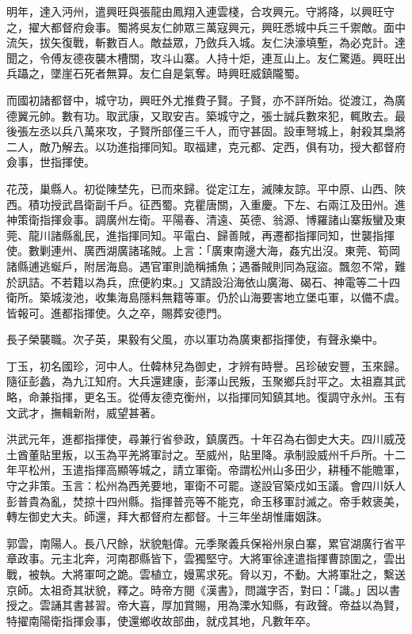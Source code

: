 \begin{pinyinscope}
明年，達入沔州，遣興旺與張龍由鳳翔入連雲棧，合攻興元。守將降，以興旺守之，擢大都督府僉事。蜀將吳友仁帥眾三萬寇興元，興旺悉城中兵三千禦敵。面中流矢，拔矢復戰，斬數百人。敵益眾，乃斂兵入城。友仁決濠填塹，為必克計。達聞之，令傅友德夜襲木槽關，攻斗山寨。人持十炬，連亙山上。友仁驚遁。興旺出兵躡之，墜崖石死者無算。友仁自是氣奪。時興旺威鎮隴蜀。

而國初諸都督中，城守功，興旺外尤推費子賢。子賢，亦不詳所始。從渡江，為廣德翼元帥。數有功。取武康，又取安吉。築城守之，張士誠兵數來犯，輒敗去。最後張左丞以兵八萬來攻，子賢所部僅三千人，而守甚固。設車弩城上，射殺其梟將二人，敵乃解去。以功進指揮同知。取福建，克元都、定西，俱有功，授大都督府僉事，世指揮使。

花茂，巢縣人。初從陳埜先，已而來歸。從定江左，滅陳友諒。平中原、山西、陜西。積功授武昌衛副千戶。征西蜀。克瞿唐關，入重慶。下左、右兩江及田州。進神策衛指揮僉事。調廣州左衛。平陽春、清遠、英德、翁源、博羅諸山寨叛蠻及東莞、龍川諸縣亂民，進指揮同知。平電白、歸善賊，再遷都指揮同知，世襲指揮使。數剿連州、廣西湖廣諸瑤賊。上言：「廣東南邊大海，姦宄出沒。東莞、筍岡諸縣逋逃蜒戶，附居海島。遇官軍則詭稱捕魚；遇番賊則同為寇盜。飄忽不常，難於訊詰。不若籍以為兵，庶便約束。」又請設沿海依山廣海、碣石、神電等二十四衛所。築城浚池，收集海島隱料無籍等軍。仍於山海要害地立堡屯軍，以備不虞。皆報可。進都指揮使。久之卒，賜葬安德門。

長子榮襲職。次子英，果毅有父風，亦以軍功為廣東都指揮使，有聲永樂中。

丁玉，初名國珍，河中人。仕韓林兒為御史，才辨有時譽。呂珍破安豐，玉來歸。隨征彭蠡，為九江知府。大兵還建康，彭澤山民叛，玉聚鄉兵討平之。太祖嘉其武略，命兼指揮，更名玉。從傅友德克衡州，以指揮同知鎮其地。復調守永州。玉有文武才，撫輯新附，威望甚著。

洪武元年，進都指揮使，尋兼行省參政，鎮廣西。十年召為右御史大夫。四川威茂土酋董貼里叛，以玉為平羌將軍討之。至威州，貼里降。承制設威州千戶所。十二年平松州，玉遣指揮高顯等城之，請立軍衛。帝謂松州山多田少，耕種不能贍軍，守之非策。玉言：松州為西羌要地，軍衛不可罷。遂設官築戍如玉議。會四川妖人彭普貴為亂，焚掠十四州縣。指揮普亮等不能克，命玉移軍討滅之。帝手敕褒美，轉左御史大夫。師還，拜大都督府左都督。十三年坐胡惟庸姻誅。

郭雲，南陽人。長八尺餘，狀貌魁偉。元季聚義兵保裕州泉白寨，累官湖廣行省平章政事。元主北奔，河南郡縣皆下，雲獨堅守。大將軍徐達遣指揮曹諒圍之，雲出戰，被執。大將軍呵之跪。雲植立，嫚罵求死。脅以刃，不動。大將軍壯之，繫送京師。太祖奇其狀貌，釋之。時帝方閱《漢書》，問識字否，對曰：「識。」因以書授之。雲誦其書甚習。帝大喜，厚加賞賜，用為溧水知縣，有政聲。帝益以為賢，特擢南陽衛指揮僉事，使還鄉收故部曲，就戍其地，凡數年卒。


\end{pinyinscope}
